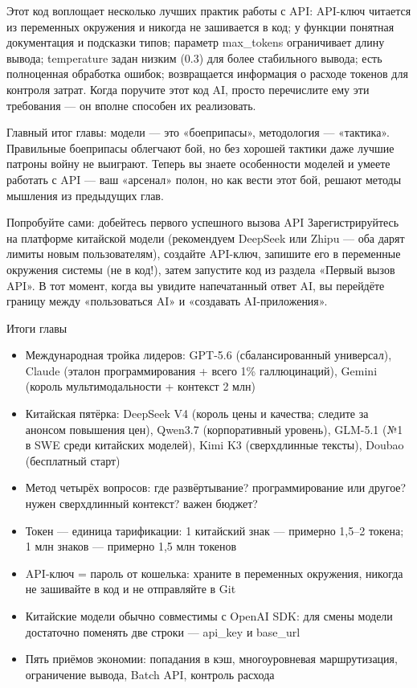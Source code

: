 Этот код воплощает несколько лучших практик работы с API: API-ключ читается из переменных окружения и никогда не зашивается в код; у функции понятная документация и подсказки типов; параметр max\_tokens ограничивает длину вывода; temperature задан низким (0.3) для более стабильного вывода; есть полноценная обработка ошибок; возвращается информация о расходе токенов для контроля затрат. Когда поручите этот код AI, просто перечислите ему эти требования — он вполне способен их реализовать.

Главный итог главы: модели — это «боеприпасы», методология — «тактика». Правильные боеприпасы облегчают бой, но без хорошей тактики даже лучшие патроны войну не выиграют. Теперь вы знаете особенности моделей и умеете работать с API — ваш «арсенал» полон, но как вести этот бой, решают методы мышления из предыдущих глав.

\begin{tcbpractice}{Попробуйте сами: добейтесь первого успешного вызова API}
Зарегистрируйтесь на платформе китайской модели (рекомендуем DeepSeek или Zhipu — оба дарят лимиты новым пользователям), создайте API-ключ, запишите его в переменные окружения системы (не в код!), затем запустите код из раздела «Первый вызов API». В тот момент, когда вы увидите напечатанный ответ AI, вы перейдёте границу между «пользоваться AI» и «создавать AI-приложения».

\end{tcbpractice}

\begin{tcbsummary}{Итоги главы}
\begin{itemize}
  \item Международная тройка лидеров: GPT-5.6 (сбалансированный универсал), Claude (эталон программирования + всего 1\% галлюцинаций), Gemini (король мультимодальности + контекст 2 млн)
  \item Китайская пятёрка: DeepSeek V4 (король цены и качества; следите за анонсом повышения цен), Qwen3.7 (корпоративный уровень), GLM-5.1 (№1 в SWE среди китайских моделей), Kimi K3 (сверхдлинные тексты), Doubao (бесплатный старт)
  \item Метод четырёх вопросов: где развёртывание? программирование или другое? нужен сверхдлинный контекст? важен бюджет?
  \item Токен — единица тарификации: 1 китайский знак — примерно 1,5–2 токена; 1 млн знаков — примерно 1,5 млн токенов
  \item API-ключ = пароль от кошелька: храните в переменных окружения, никогда не зашивайте в код и не отправляйте в Git
  \item Китайские модели обычно совместимы с OpenAI SDK: для смены модели достаточно поменять две строки — api\_key и base\_url
  \item Пять приёмов экономии: попадания в кэш, многоуровневая маршрутизация, ограничение вывода, Batch API, контроль расхода
\end{itemize}

\end{tcbsummary}
